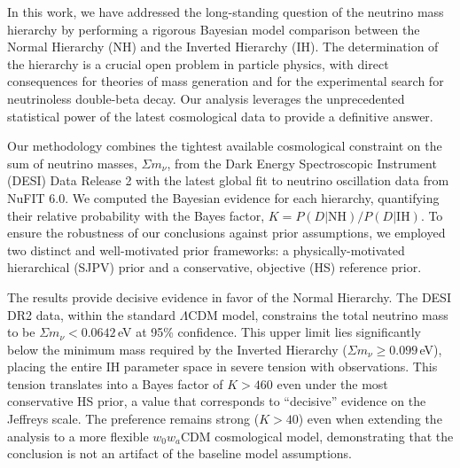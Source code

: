 \documentclass[]{article}
\begin{document}
In this work, we have addressed the long-standing question of the neutrino mass hierarchy by performing a rigorous Bayesian model comparison between the Normal Hierarchy (NH) and the Inverted Hierarchy (IH). The determination of the hierarchy is a crucial open problem in particle physics, with direct consequences for theories of mass generation and for the experimental search for neutrinoless double-beta decay. Our analysis leverages the unprecedented statistical power of the latest cosmological data to provide a definitive answer.

Our methodology combines the tightest available cosmological constraint on the sum of neutrino masses, $\Sigma m_\nu$, from the Dark Energy Spectroscopic Instrument (DESI) Data Release 2 with the latest global fit to neutrino oscillation data from NuFIT 6.0. We computed the Bayesian evidence for each hierarchy, quantifying their relative probability with the Bayes factor, $K = P(D|\text{NH}) / P(D|\text{IH})$. To ensure the robustness of our conclusions against prior assumptions, we employed two distinct and well-motivated prior frameworks: a physically-motivated hierarchical (SJPV) prior and a conservative, objective (HS) reference prior.

The results provide decisive evidence in favor of the Normal Hierarchy. The DESI DR2 data, within the standard $\Lambda$CDM model, constrains the total neutrino mass to be $\Sigma m_\nu < 0.0642$\,eV at 95\% confidence. This upper limit lies significantly below the minimum mass required by the Inverted Hierarchy ($\Sigma m_\nu \ge 0.099$\,eV), placing the entire IH parameter space in severe tension with observations. This tension translates into a Bayes factor of $K > 460$ even under the most conservative HS prior, a value that corresponds to ``decisive'' evidence on the Jeffreys scale. The preference remains strong ($K > 40$) even when extending the analysis to a more flexible $w_0w_a$CDM cosmological model, demonstrating that the conclusion is not an artifact of the baseline model assumptions.
\end{document}
